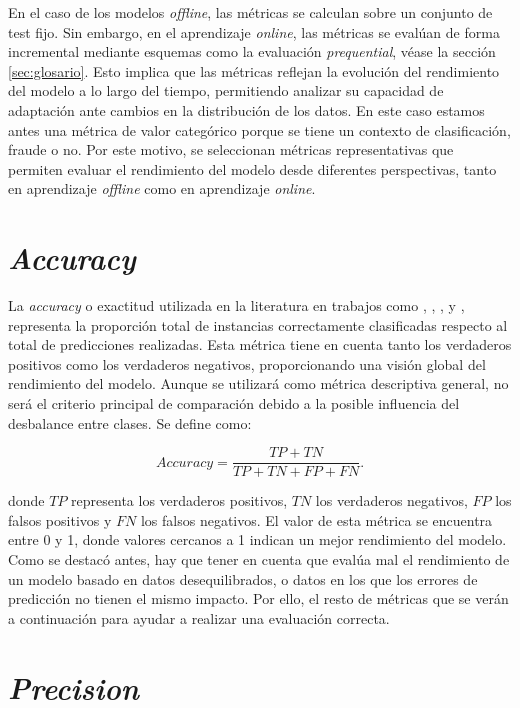\documentclass[12pt,a4paper]{report}
\begin{document}
En el caso de los modelos \emph{offline}, las métricas se calculan sobre un conjunto de test fijo. Sin embargo, en el aprendizaje \emph{online}, las métricas se evalúan de forma incremental mediante esquemas como la evaluación \emph{prequential}, véase la sección \ref{sec:glosario}. Esto implica que las métricas reflejan la evolución del rendimiento del modelo a lo largo del tiempo, permitiendo analizar su capacidad de adaptación ante cambios en la distribución de los datos. En este caso estamos antes una métrica de valor categórico porque se tiene un contexto de clasificación, fraude o no. Por este motivo, se seleccionan métricas representativas que permiten evaluar el rendimiento del modelo desde diferentes perspectivas, tanto en aprendizaje \emph{offline} como en aprendizaje \emph{online}.


\section{\emph{Accuracy}}

La \emph{accuracy} o exactitud utilizada en la literatura en trabajos como \cite{articulo1}, \cite{articuloBase}, \cite{articulo2}, \cite{articulo3} y \cite{articulo5}, representa la proporción total de instancias correctamente clasificadas respecto al total de predicciones realizadas. Esta métrica tiene en cuenta tanto los verdaderos positivos como los verdaderos negativos, proporcionando una visión global del rendimiento del modelo. Aunque se utilizará como métrica descriptiva general, no será el criterio principal de comparación debido a la posible influencia del desbalance entre clases. Se define como:

\[
Accuracy = \frac{TP + TN}{TP + TN + FP + FN}
.\]

\noindent donde $TP$ representa los verdaderos positivos, $TN$ los verdaderos negativos, $FP$ los falsos positivos y $FN$ los falsos negativos. El valor de esta métrica se encuentra entre 0 y 1, donde valores cercanos a 1 indican un mejor rendimiento del modelo. Como se destacó antes, hay que tener en cuenta que evalúa mal el rendimiento de un modelo basado en datos desequilibrados, o datos en los que los errores de predicción no tienen el mismo impacto. Por ello, el resto de métricas que se verán a continuación para ayudar a realizar una evaluación correcta.


\section{\emph{Precision}}
\end{document}
